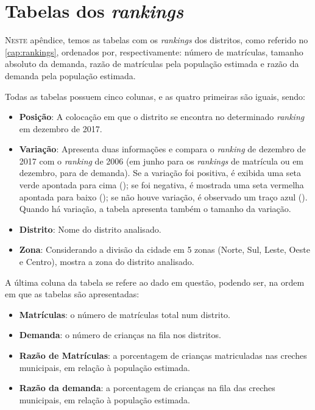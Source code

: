 \chapter{Tabelas dos \textit{rankings}}
\label{apend:rankings}

\lettrine{N}{este} apêndice, temos as tabelas com os \textit{rankings} dos distritos, como referido no \autoref{cap:rankings}, ordenados por, respectivamente: número de matrículas, tamanho absoluto da demanda, razão de matrículas pela população estimada e razão da demanda pela população estimada.

Todas as tabelas possuem cinco colunas, e as quatro primeiras são iguais, sendo:

\begin{itemize}
	\item \textbf{Posição}: A colocação em que o distrito se encontra no determinado \textit{ranking} em dezembro de 2017.
	\item \textbf{Variação}: Apresenta duas informações e compara o \textit{ranking} de dezembro de 2017 com o \textit{ranking} de 2006 (em junho para os \textit{rankings} de matrícula ou em dezembro, para de demanda). Se a variação foi positiva, é exibida uma seta verde apontada para cima (\aumento); se foi negativa, é mostrada uma seta vermelha apontada para baixo (\queda); se não houve variação, é observado um traço azul (\mesmo). Quando há variação, a tabela apresenta também o tamanho da variação.
	\item \textbf{Distrito}: Nome do distrito analisado.
	\item \textbf{Zona}: Considerando a divisão da cidade em 5 zonas (Norte, Sul, Leste, Oeste e Centro), mostra a zona do distrito analisado.
\end{itemize}

A última coluna da tabela se refere ao dado em questão, podendo ser, na ordem em que as tabelas são apresentadas:

\begin{itemize}
	\item \textbf{Matrículas}: o número de matrículas total num distrito.
	\item \textbf{Demanda}: o número de crianças na fila nos distritos.
	\item \textbf{Razão de Matrículas}: a porcentagem de crianças matriculadas nas creches municipais, em relação à população estimada.
	\item \textbf{Razão da demanda}: a porcentagem de crianças na fila das creches municipais, em relação à população estimada.
\end{itemize}